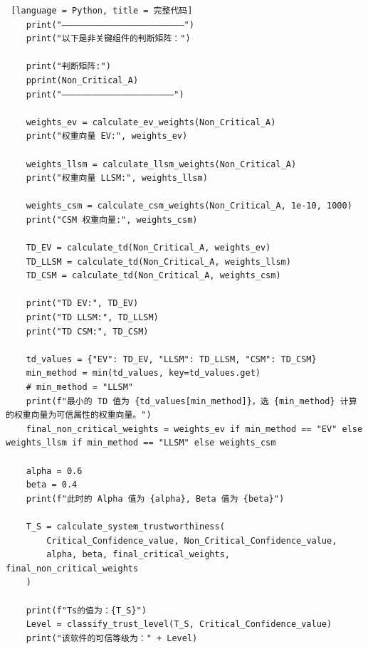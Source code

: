 \documentclass[14pt,a4paper,UTF8,twoside]{article}
\begin{document}
\begin{lstlisting} [language = Python, title = 完整代码]
    print("————————————————————————")
    print("以下是非关键组件的判断矩阵：")
    
    print("判断矩阵:")
    pprint(Non_Critical_A)
    print("——————————————————————")
    
    weights_ev = calculate_ev_weights(Non_Critical_A)
    print("权重向量 EV:", weights_ev)
    
    weights_llsm = calculate_llsm_weights(Non_Critical_A)
    print("权重向量 LLSM:", weights_llsm)
    
    weights_csm = calculate_csm_weights(Non_Critical_A, 1e-10, 1000)
    print("CSM 权重向量:", weights_csm)
    
    TD_EV = calculate_td(Non_Critical_A, weights_ev)
    TD_LLSM = calculate_td(Non_Critical_A, weights_llsm)
    TD_CSM = calculate_td(Non_Critical_A, weights_csm)
    
    print("TD EV:", TD_EV)
    print("TD LLSM:", TD_LLSM)
    print("TD CSM:", TD_CSM)
    
    td_values = {"EV": TD_EV, "LLSM": TD_LLSM, "CSM": TD_CSM}
    min_method = min(td_values, key=td_values.get)
    # min_method = "LLSM"
    print(f"最小的 TD 值为 {td_values[min_method]}，选 {min_method} 计算的权重向量为可信属性的权重向量。")
    final_non_critical_weights = weights_ev if min_method == "EV" else weights_llsm if min_method == "LLSM" else weights_csm
    
    alpha = 0.6
    beta = 0.4
    print(f"此时的 Alpha 值为 {alpha}, Beta 值为 {beta}")
    
    T_S = calculate_system_trustworthiness(
        Critical_Confidence_value, Non_Critical_Confidence_value,
        alpha, beta, final_critical_weights, final_non_critical_weights
    )
    
    print(f"Ts的值为：{T_S}")
    Level = classify_trust_level(T_S, Critical_Confidence_value)
    print("该软件的可信等级为：" + Level)
\end{lstlisting}
\end{document}

